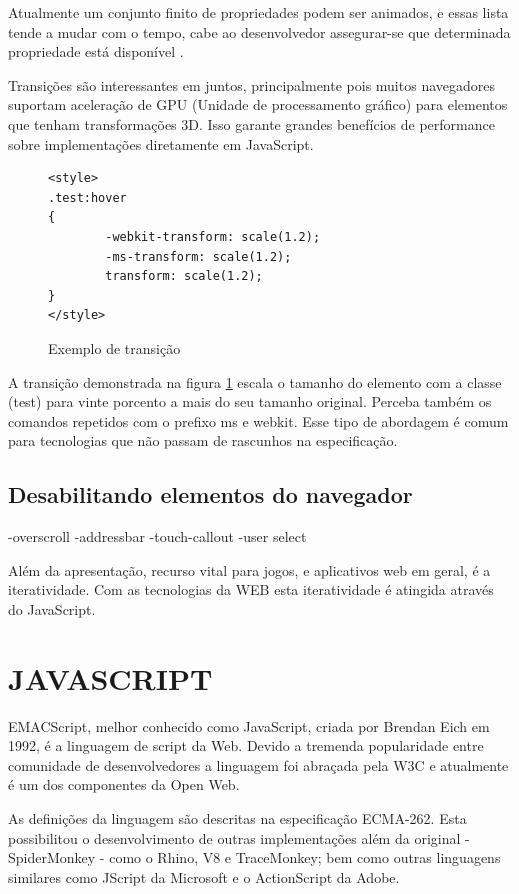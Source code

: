 \documentclass[
12pt,
a4paper,
portuges,
draft
]{report}
\begin{document}
Atualmente um conjunto finito de propriedades podem ser animados, e essas
lista tende a mudar com o tempo, cabe ao desenvolvedor assegurar-se que 
determinada propriedade está disponível \autocite{mdnTransitions}.

Transições são interessantes em juntos, principalmente pois
muitos navegadores suportam aceleração de GPU (Unidade de
processamento gráfico) para elementos que tenham transformações 3D. Isso
garante grandes benefícios de performance sobre implementações diretamente
em JavaScript.



\begin{figure}
\centering
\begin{verbatim}
<style>
.test:hover
{
        -webkit-transform: scale(1.2);
        -ms-transform: scale(1.2);
        transform: scale(1.2);
}
</style>
\end{verbatim}
\caption{Exemplo de transição}
\label{fig:CSSTransition}
\end{figure}


A transição demonstrada na figura \ref{fig:CSSTransition} escala o tamanho do elemento com 
a classe (test) para vinte porcento a mais do seu tamanho original. Perceba também os comandos repetidos
com o prefixo ms e webkit. Esse tipo de  abordagem é comum para tecnologias que não passam de rascunhos
na especificação.

\subsection{Desabilitando elementos do navegador}
-overscroll
-addressbar
-touch-callout
-user select


Além da apresentação, recurso vital para jogos, e aplicativos web em geral, é a iteratividade. Com
as tecnologias da WEB esta iteratividade é atingida através do JavaScript.

\section{JAVASCRIPT}

EMACScript, melhor conhecido como JavaScript, criada por Brendan Eich
em 1992, é a linguagem de script da Web. Devido a tremenda popularidade entre
comunidade de desenvolvedores a linguagem foi abraçada pela W3C e
atualmente é um dos componentes da Open Web.

As definições da linguagem são descritas na especificação ECMA-262.
Esta possibilitou o desenvolvimento de outras implementações além da
original - SpiderMonkey - como o Rhino, V8 e TraceMonkey; bem como
outras linguagens similares como JScript da Microsoft e o ActionScript
da Adobe.
\end{document}

